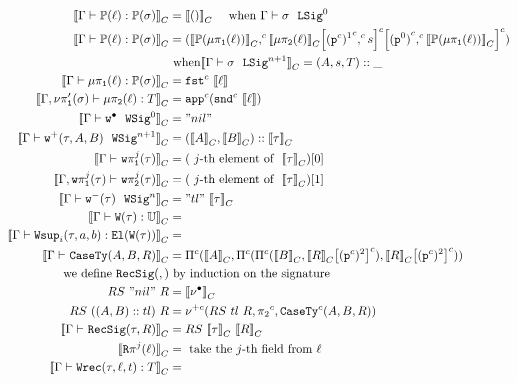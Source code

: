 \begin{align*}
  \denotesC{\goodTerm{\Gm}{\Tkg{\lkg}}{\TyTkg{\lsig}}} &= \denotesC{\unit}
  \quad \text{ when \goodSig{\Gm}{\lsig}{0}} \\
  \denotesC{\goodTerm{\Gm}{\Tkg{\lkg}}{\TyTkg{\lsig}}} &= \Gpair{\denotesC{\Tkg{\lkgproj{1}{\lkg}}}}{\Gsub{\Gsub{\denotesC{\lkgproj{2}{\lkg}}}{\GSubstExt{\Glued{\GSubstWeak{1}}}{s}}}{\GSubstExt{\Glued{(\SubstId)}}{\denotesC{\Tkg{\lkgproj{1}{\lkg}}}}}}
  \\ &\text{ when} \denotesC{\goodSig{\Gm}{\lsig}{n+1}} = (A, s, T)::\_ \\
  \denotesC{\goodTerm{\Gm}{\lkgproj{1}{\lkg}}{\TyTkg{\lsig}}} &= \Gfst{\denotes{\lkg}} \\
  \denotesC{\goodTerm{\Gm, \lsigprojT{\lsig}}{\lkgproj{2}{\lkg}}{T}} &= \Gapp{\Gsnd{\denotes{\lkg}}} \\
  \denotesC{\goodWSig{\Gm}{\WSigEmp}{0}} &= "nil" \\
  \denotesC{\goodWSig{\Gm}{\WSigAdd{\wsig}{A}{B}}{n+1}} &= (\denotesC{A} , \denotesC{B}) :: \denotesC{\wsig}\\
  \denotesC{\goodType{\Gm}{\wsigproj{j}{1}{\wsig}}{}} &= (\text{ $j$-th element of }~\denotesC{\wsig})[0]\\
  \denotesC{\goodType{\Gm, \wsigproj{j}{1}{\wsig}}{\wsigproj{j}{2}{\wsig}}{}} &= (\text{ $j$-th element of }~\denotesC{\wsig})[1]\\
  \denotesC{\goodWSig{\Gm}{\WSigSub{\wsig}}{n}} &= "tl"~\denotesC{\wsig}\\
  \denotesC{\goodTerm{\Gm}{\wcode{\wsig}}{\cU}} &= \\
  \denotesC{\goodTerm{\Gm}{\Wsup{i}{\wsig}{a}{b}}{\El{\wcode{\wsig}}}} &= \\
  \denotesC{\goodType{\Gm}{\CaseSig{A}{B}{R}}{}} &= 
  {\GluedPi{\denotesC{A}}{\GluedPi {\GluedPi{\denotesC{B}}{\Gsub{\denotesC{R}}{\GSubstWeak{2}}}} {\Gsub{\denotesC{R}}{\GSubstWeak{2}}}}} \\
  \text{we define } \RecSig{}{} &\text{ by induction on the signature} \\
  RS~"nil"~R &= \denotesC{\LSigEmp} \\
  RS~((A, B) :: tl)~R &= \GLSigAdd{RS~tl~R}{\Glued{\pi_2}}{\GCaseSig{A}{B}{R}} \\
  \denotesC{\goodType{\Gm}{\RecSig{\wsig}{R}}{}} &= RS~\denotesC{\tau}~\denotesC{R} \\
  \denotesC{\Recproj{j}{\lkg}} &= \text{ take the $j$-th field from } \lkg \\
  \denotesC{\goodTerm{\Gm}{\Wrec{\wsig}{\lkg}{t}}{T}} &= \\
\end{align*}


